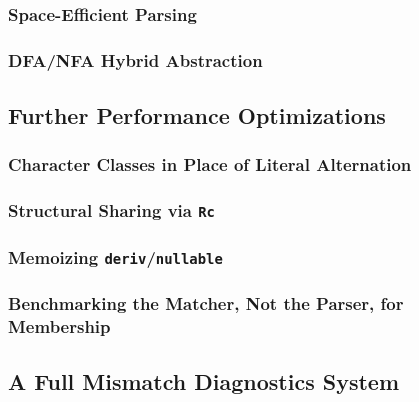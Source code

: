\subsubsection{Space-Efficient Parsing}
\label{sec:space-efficient-parsing}

\subsubsection{DFA/NFA Hybrid Abstraction}
\label{sec:dfa-nfa-hybrid}

\subsection{Further Performance Optimizations}
\label{sec:further-performance-optimizations}

\subsubsection{Character Classes in Place of Literal Alternation}
\label{sec:char-class-optimization}

\subsubsection{Structural Sharing via \texttt{Rc}}
\label{sec:rc-sharing-optimization}

\subsubsection{Memoizing \texttt{deriv}/\texttt{nullable}}
\label{sec:memoization-optimization}

\subsubsection{Benchmarking the Matcher, Not the Parser, for Membership}
\label{sec:matcher-benchmark-fairness}

\subsection{A Full Mismatch Diagnostics System}
\label{sec:mismatch-diagnostics-future}
